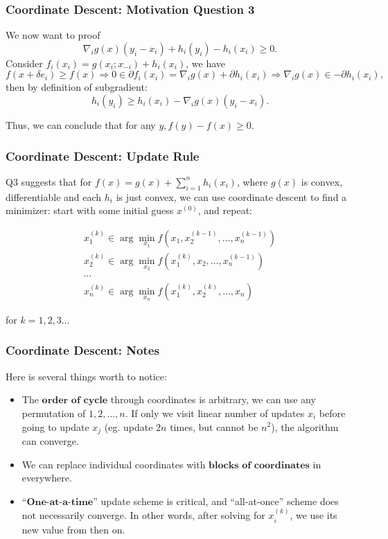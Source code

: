 \begin{frame}
\frametitle{Coordinate Descent: Motivation Question 3}
We now want to proof
$$\nabla_i g(x)\left(y_i-x_i\right)+h_i\left(y_i\right)-h_i\left(x_i\right) \geq 0.$$
Consider $f_i\left(x_i\right)=g\left(x_i ; x_{-i}\right)+h_i\left(x_i\right)$, we have
$$
f\left(x+\delta e_i\right) \geq f(x) \Rightarrow 0 \in \partial f_i\left(x_i\right)=\nabla_i g(x)+\partial h_i\left(x_i\right) \Rightarrow \nabla_i g(x) \in-\partial h_i\left(x_i\right),
$$
then by definition of subgradient:
$$h_i\left(y_i\right) \geq h_i\left(x_i\right)-\nabla_i g(x)\left(y_i-x_i\right).$$

Thus, we can conclude that for any $y, f(y)-f(x) \geq 0$.
\end{frame}

\begin{frame}
    \frametitle{Coordinate Descent: Update Rule}
Q3 suggests that for $f(x)=g(x)+\sum_{i=1}^n h_i\left(x_i\right)$, where $g(x)$ is convex, differentiable and each $h_i$ is just convex, we can use coordinate descent to find a minimizer: start with some initial guess $x^{(0)}$, and repeat:

$$\begin{gathered}
x_1^{(k)} \in \arg \min _{x_1} f\left(x_1, x_2^{(k-1)}, \ldots, x_n^{(k-1)}\right) \\
x_2^{(k)} \in \arg \min _{x_2} f\left(x_1^{(k)}, x_2, \ldots, x_n^{(k-1)}\right)\\
\cdots \\
x_n^{(k)} \in \arg \min _{x_n} f\left(x_1^{(k)}, x_2^{(k)}, \ldots, x_n\right)
\end{gathered}$$

for $k=1,2,3 \ldots$
\end{frame}

\begin{frame}
    \frametitle{Coordinate Descent: Notes}
Here is several things worth to notice:
\begin{itemize}
    \item The $\textbf{order of cycle}$ through coordinates is arbitrary, we can use any permutation of $1,2, \ldots, n$. If only we visit linear number of updates $x_i$ before going to update $x_j$ (eg. update $2 n$ times, but cannot be $n^2$), the algorithm can converge.
    \item We can replace individual coordinates with $\textbf{blocks of coordinates}$ in everywhere.
    \item ``$\textbf{One-at-a-time}$'' update scheme is critical, and ``all-at-once'' scheme does not necessarily converge. In other words, after solving for $x_i^{(k)}$, we use its new value from then on.
\end{itemize}
\end{frame}

